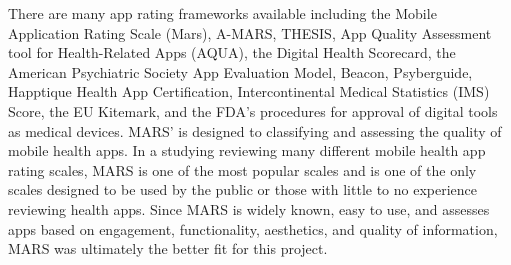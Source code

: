 There are many app rating frameworks available including the Mobile Application Rating Scale (Mars), A-MARS, THESIS, App Quality Assessment tool for Health-Related Apps (AQUA), the Digital Health Scorecard, the American Psychiatric Society App Evaluation Model, Beacon, Psyberguide, Happtique Health App Certification, Intercontinental Medical Statistics (IMS) Score, the EU Kitemark, and the FDA’s procedures for approval of digital tools as medical devices\cite{Morley2024}. MARS’ is designed to classifying and assessing the quality of mobile health apps\cite{Stoyanov2015}. In a studying reviewing many different mobile health app rating scales, MARS is one of the most popular scales and is one of the only scales designed to be used by the public or those with little to no experience reviewing health apps\cite{AzadKhaneghah2020}. Since MARS is widely known, easy to use, and assesses apps based on engagement, functionality, aesthetics, and quality of information, MARS was ultimately the better fit for this project.


